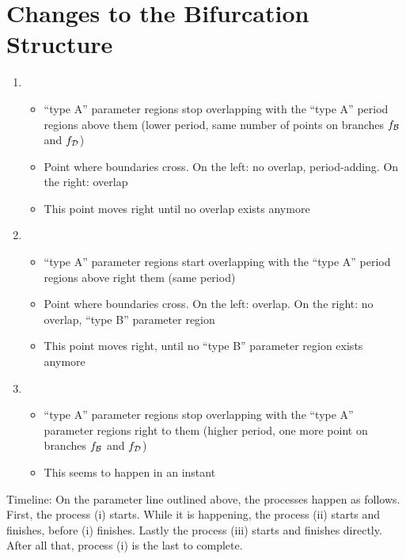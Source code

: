 \section{Changes to the Bifurcation Structure}
\label{sec:add.change}

\begin{enumerate}
	\item \begin{itemize}
		      \item ``type A'' parameter regions stop overlapping with the ``type A'' period regions above them (lower period, same number of points on branches $f_{\mathcal{B}}$ and $f_{\mathcal{D}}$)
		      \item Point where boundaries cross. On the left: no overlap, period-adding. On the right: overlap
		      \item This point moves right until no overlap exists anymore
	      \end{itemize}
	\item \begin{itemize}
		      \item ``type A'' parameter regions start overlapping with the ``type A'' period regions above right them (same period)
		      \item Point where boundaries cross. On the left: overlap. On the right: no overlap, ``type B'' parameter region
		      \item This point moves right, until no ``type B'' parameter region exists anymore
	      \end{itemize}
	\item \begin{itemize}
		      \item ``type A'' parameter regions stop overlapping with the ``type A'' parameter regions right to them (higher period, one more point on branches $f_{\mathcal{B}}$ and $f_{\mathcal{D}}$)
		      \item This seems to happen in an instant
	      \end{itemize}
\end{enumerate}

Timeline:
On the parameter line outlined above, the processes happen as follows.
First, the process (i) starts.
While it is happening, the process (ii) starts and finishes, before (i) finishes.
Lastly the process (iii) starts and finishes directly.
After all that, process (i) is the last to complete.



